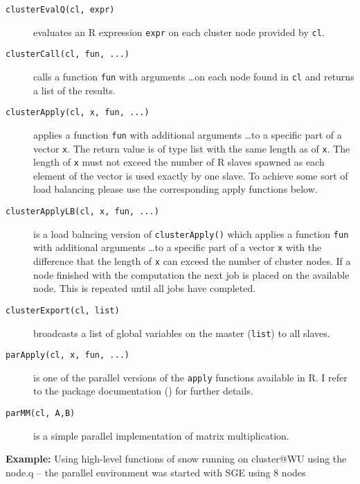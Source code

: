 \begin{description}
\item[\texttt{clusterEvalQ(cl, expr)}] evaluates an R expression
  \texttt{expr} on
  each cluster node provided by \texttt{cl}. 
\item[\texttt{clusterCall(cl, fun, ...)}] calls a function
  \texttt{fun} with arguments \ldots on each node found in \texttt{cl}
  and returns a list of the results.
\item[\texttt{clusterApply(cl, x, fun, ...)}] applies a function
  \texttt{fun} with additional arguments \ldots to a specific part of
  a vector \texttt{x}. The return value is of type list with the same
  length as of \texttt{x}. The length of
  \texttt{x} must not exceed the 
  number of R slaves spawned as each element of the vector is used
  exactly by one slave. To achieve some sort of load balancing please
  use the corresponding apply functions below.
\item[\texttt{clusterApplyLB(cl, x, fun, ...)}] is a load balncing
  version of \texttt{clusterApply()} which applies a function
  \texttt{fun} with additional arguments \ldots to a specific part of
  a vector \texttt{x} with the difference that the length of
  \texttt{x} can exceed the number of cluster nodes. If a node
  finished with the computation the next job is placed on the
  available node. This is repeated until all jobs have completed.
\item[\texttt{clusterExport(cl, list)}] broadcasts a list of global
  variables on the master (\texttt{list}) to all slaves.
\item[\texttt{parApply(cl, x, fun, ...)}] is one of the parallel
  versions of the \texttt{apply} functions available in R. I refer to
  the package documentation (\cite{tierney07snow}) for further details.
\item[\texttt{parMM(cl, A,B)}] is a simple parallel implementation of
  matrix multiplication. 
\end{description}


\textbf{Example:} Using high-level functions of snow\newline
running on cluster@WU using the node.q -- the parallel environment was
started with SGE using 8 nodes


